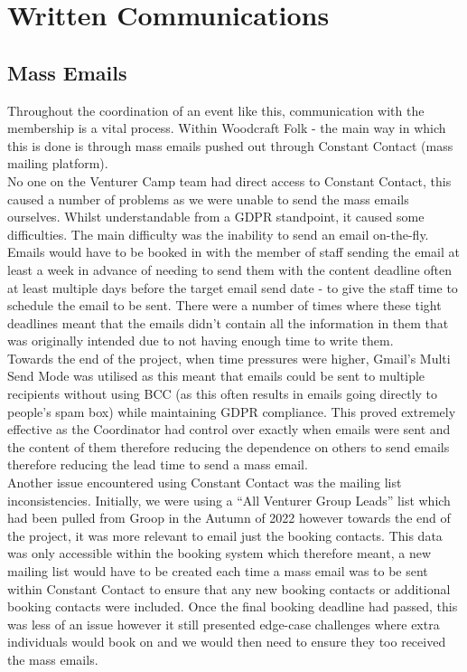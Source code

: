 \chapter{Written Communications}
\section{Mass Emails}
Throughout the coordination of an event like this, communication with the membership is a vital process. Within Woodcraft Folk - the main way in which this is done is through mass emails pushed out through Constant Contact (mass mailing platform).\\

No one on the Venturer Camp team had direct access to Constant Contact, this caused a number of problems as we were unable to send the mass emails ourselves. Whilst understandable from a GDPR standpoint, it caused some difficulties. The main difficulty was the inability to send an email on-the-fly. Emails would have to be booked in with the member of staff sending the email at least a week in advance of needing to send them with the content deadline often at least multiple days before the target email send date - to give the staff time to schedule the email to be sent. There were a number of times where these tight deadlines meant that the emails didn't contain all the information in them that was originally intended due to not having enough time to write them. \\

Towards the end of the project, when time pressures were higher, Gmail's Multi Send Mode was utilised as this meant that emails could be sent to multiple recipients without using BCC (as this often results in emails going directly to people's spam box) while maintaining GDPR compliance. This proved extremely effective as the Coordinator had control over exactly when emails were sent and the content of them therefore reducing the dependence on others to send emails therefore reducing the lead time to send a mass email.\\

Another issue encountered using Constant Contact was the mailing list inconsistencies. Initially, we were using a ``All Venturer Group Leads'' list which had been pulled from Groop in the Autumn of 2022 however towards the end of the project, it was more relevant to email just the booking contacts. This data was only accessible within the booking system which therefore meant, a new mailing list would have to be created each time a mass email was to be sent within Constant Contact to ensure that any new booking contacts or additional booking contacts were included. Once the final booking deadline had passed, this was less of an issue however it still presented edge-case challenges where extra individuals would book on and we would then need to ensure they too received the mass emails.\\

